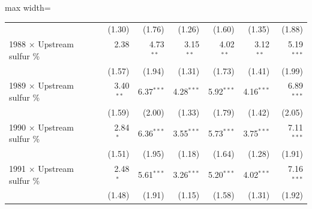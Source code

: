 \begin{table}[htbp]
{\begin{adjustbox}{max width=\linewidth}
\begin{tabular}{lrrrrrr}
 & (\phantom{-}1.30)\phantom{$^{***}$} & (\phantom{-}1.76)\phantom{$^{***}$} & (\phantom{-}1.26)\phantom{$^{***}$} & (\phantom{-}1.60)\phantom{$^{***}$} & (\phantom{-}1.35)\phantom{$^{***}$} & (\phantom{-}1.88)\phantom{$^{***}$} \\
1988 $\times$ Upstream sulfur \% & \phantom{(}\phantom{-}2.38$^{\phantom{*}\phantom{*}\phantom{*}}$ & \phantom{(}\phantom{-}4.73$^{**\phantom{*}}$ & \phantom{(}\phantom{-}3.15$^{**\phantom{*}}$ & \phantom{(}\phantom{-}4.02$^{**\phantom{*}}$ & \phantom{(}\phantom{-}3.12$^{**\phantom{*}}$ & \phantom{(}\phantom{-}5.19$^{***}$ \\
 & (\phantom{-}1.57)\phantom{$^{***}$} & (\phantom{-}1.94)\phantom{$^{***}$} & (\phantom{-}1.31)\phantom{$^{***}$} & (\phantom{-}1.73)\phantom{$^{***}$} & (\phantom{-}1.41)\phantom{$^{***}$} & (\phantom{-}1.99)\phantom{$^{***}$} \\
1989 $\times$ Upstream sulfur \% & \phantom{(}\phantom{-}3.40$^{**\phantom{*}}$ & \phantom{(}\phantom{-}6.37$^{***}$ & \phantom{(}\phantom{-}4.28$^{***}$ & \phantom{(}\phantom{-}5.92$^{***}$ & \phantom{(}\phantom{-}4.16$^{***}$ & \phantom{(}\phantom{-}6.89$^{***}$ \\
 & (\phantom{-}1.59)\phantom{$^{***}$} & (\phantom{-}2.00)\phantom{$^{***}$} & (\phantom{-}1.33)\phantom{$^{***}$} & (\phantom{-}1.79)\phantom{$^{***}$} & (\phantom{-}1.42)\phantom{$^{***}$} & (\phantom{-}2.05)\phantom{$^{***}$} \\
1990 $\times$ Upstream sulfur \% & \phantom{(}\phantom{-}2.84$^{*\phantom{*}\phantom{*}}$ & \phantom{(}\phantom{-}6.36$^{***}$ & \phantom{(}\phantom{-}3.55$^{***}$ & \phantom{(}\phantom{-}5.73$^{***}$ & \phantom{(}\phantom{-}3.75$^{***}$ & \phantom{(}\phantom{-}7.11$^{***}$ \\
 & (\phantom{-}1.51)\phantom{$^{***}$} & (\phantom{-}1.95)\phantom{$^{***}$} & (\phantom{-}1.18)\phantom{$^{***}$} & (\phantom{-}1.64)\phantom{$^{***}$} & (\phantom{-}1.28)\phantom{$^{***}$} & (\phantom{-}1.91)\phantom{$^{***}$} \\
1991 $\times$ Upstream sulfur \% & \phantom{(}\phantom{-}2.48$^{*\phantom{*}\phantom{*}}$ & \phantom{(}\phantom{-}5.61$^{***}$ & \phantom{(}\phantom{-}3.26$^{***}$ & \phantom{(}\phantom{-}5.20$^{***}$ & \phantom{(}\phantom{-}4.02$^{***}$ & \phantom{(}\phantom{-}7.16$^{***}$ \\
 & (\phantom{-}1.48)\phantom{$^{***}$} & (\phantom{-}1.91)\phantom{$^{***}$} & (\phantom{-}1.15)\phantom{$^{***}$} & (\phantom{-}1.58)\phantom{$^{***}$} & (\phantom{-}1.31)\phantom{$^{***}$} & (\phantom{-}1.92)\phantom{$^{***}$} \\

\end{tabular}
\end{adjustbox}}
\end{table}
